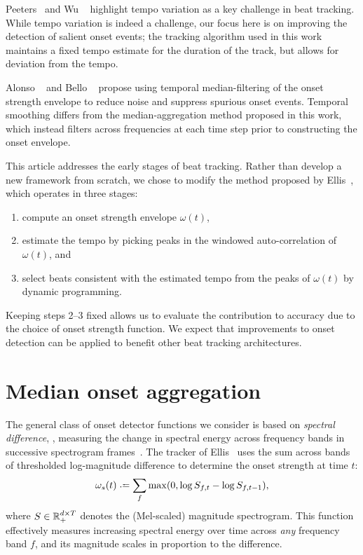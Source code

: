 \documentclass{article}
\begin{document}
Peeters~\cite{peeters2005time} and Wu \etal~\cite{wu2011two} highlight tempo variation as a 
key challenge in beat tracking. While tempo variation is indeed a challenge, our focus here 
is on improving the detection of salient onset events; the tracking algorithm used in
this work maintains a fixed tempo estimate for the duration of the track, but allows for
deviation from the tempo.

Alonso \etal~\cite{alonso2004tempo} and Bello \etal~\cite{bello2005tutorial} propose using 
temporal median-filtering of the onset strength envelope to reduce noise and suppress
spurious onset events.  Temporal smoothing differs from the median-aggregation method 
proposed in this work, which instead filters across frequencies at each time step prior to
constructing the onset envelope.

This article addresses the early stages of beat tracking.  Rather
than develop a new framework from scratch, we chose to modify the method
proposed by Ellis~\cite{ellis2007beat}, which operates in three stages:
\begin{enumerate}\addtolength{\itemsep}{-0.60\baselineskip}
\item compute an onset strength envelope $\omega(t)$,
\item estimate the tempo by picking peaks in the windowed auto-correlation of $\omega(t)$,
and
\item select beats consistent with the estimated tempo from the peaks of $\omega(t)$ by 
dynamic programming.
\end{enumerate}
Keeping steps 2--3 fixed allows us to evaluate the contribution to accuracy due to the
choice of onset strength function.
We expect that improvements to onset detection can be applied to benefit other beat
tracking architectures.

\section{Median onset aggregation}
\label{sec:onsets}
The general class of onset detector functions we consider is based on \emph{spectral 
difference}, \ie, measuring the change in spectral energy across frequency bands in 
successive spectrogram frames~\cite{bello2005tutorial}. The tracker 
of Ellis~\cite{ellis2007beat} uses the sum across bands of thresholded log-magnitude
difference to determine the onset strength at time $t$:
\begin{equation}
\omega_s(t) \defeq \sum_f \max(0, \log S_{f, t} - \log S_{f, t-1}),\label{eq:onset:sum}
\end{equation}
where $S \in \mathbb{R}_+^{d\times T}$ denotes the (Mel-scaled) magnitude spectrogram.  
This function effectively measures increasing spectral energy over time across 
\emph{any} frequency band $f$, and its magnitude scales in proportion to the 
difference.
\end{document}
